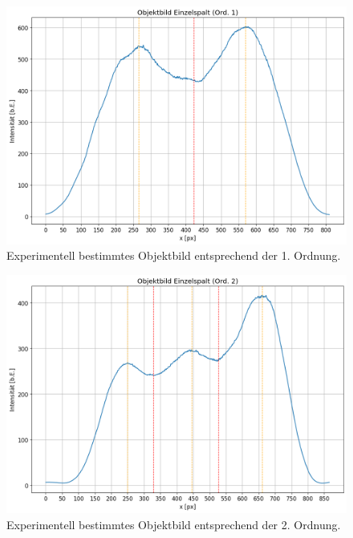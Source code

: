 \begin{figure}[H]
  \centering
  \includegraphics[width=.9\textwidth]{files/plots/4/es_praxis_objektbild_ord1.png}
  \caption{Experimentell bestimmtes Objektbild entsprechend der 1. Ordnung.}
  \label{fig:es_praxis_objektbild_ord1}
\end{figure}

\begin{figure}[H]
  \centering
  \includegraphics[width=.9\textwidth]{files/plots/4/es_praxis_objektbild_ord2.png}
  \caption{Experimentell bestimmtes Objektbild entsprechend der 2. Ordnung.}
  \label{fig:es_praxis_objektbild_ord2}
\end{figure}

